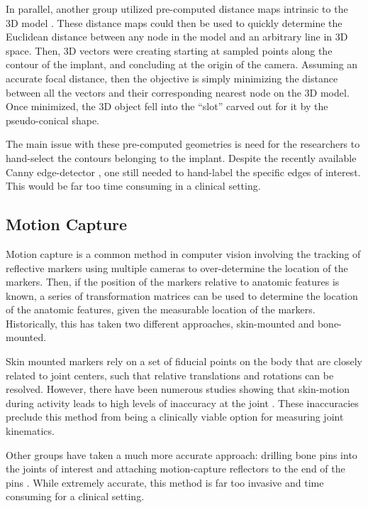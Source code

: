 In parallel, another group utilized pre-computed distance maps intrinsic to the 3D model \cite{lavalleeRecoveringPositionOrientation1995,zuffiModelbasedMethodReconstruction1999}. These distance maps could then be used to quickly determine the Euclidean distance between any node in the model and an arbitrary line in 3D space. Then, 3D vectors were creating starting at sampled points along the contour of the implant, and concluding at the origin of the camera. Assuming an accurate focal distance, then the objective is simply minimizing the distance between all the vectors and their corresponding nearest node on the 3D model. Once minimized, the 3D object fell into the ``slot'' carved out for it by the pseudo-conical shape.


The main issue with these pre-computed geometries is need for the researchers to hand-select the contours belonging to the implant. Despite the recently available Canny edge-detector \cite{cannyComputationalApproachEdge1986}, one still needed to hand-label the specific edges of interest. This would be far too time consuming in a clinical setting.


\subsection{Motion Capture}

Motion capture is a common method in computer vision involving the tracking of reflective markers using multiple cameras to over-determine the location of the markers. Then, if the position of the markers relative to anatomic features is known, a series of transformation matrices can be used to determine the location of the anatomic features, given the measurable location of the markers. Historically, this has taken two different approaches, skin-mounted and bone-mounted. 

Skin mounted markers rely on a set of fiducial points on the body that are closely related to joint centers, such that relative translations and rotations can be resolved. However, there have been numerous studies showing that skin-motion during activity leads to high levels of inaccuracy at the joint \cite{gaoInvestigationSoftTissue2008,garlingSofttissueArtefactAssessment2007,linEffectsSoftTissue2016,kuoInfluenceSoftTissue2011}. These inaccuracies preclude this method from being a clinically viable option for measuring joint kinematics.

Other groups have taken a much more accurate approach: drilling bone pins into the joints of interest and attaching motion-capture reflectors to the end of the pins \cite{lafortuneThreedimensionalKinematicsHuman1992}. While extremely accurate, this method is far too invasive and time consuming for a clinical setting.

